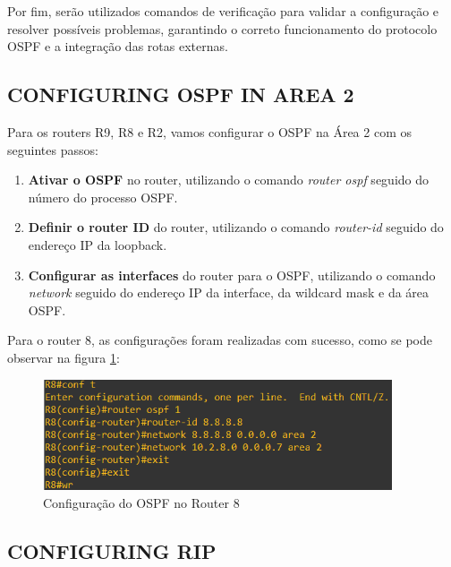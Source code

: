 \documentclass[11pt,english, openright, oneside]{book}
\begin{document}
Por fim, serão utilizados comandos de verificação para validar a configuração e resolver possíveis problemas, garantindo o correto funcionamento do protocolo OSPF e a integração das rotas externas.
\vspace{0.2cm}

\subsection{CONFIGURING OSPF IN AREA 2}
\vspace{0.2cm}

Para os routers R9, R8 e R2, vamos configurar o OSPF na Área 2 com os seguintes passos:
\vspace{0.2cm}

\begin{enumerate}
  \item \textbf{Ativar o OSPF} no router, utilizando o comando \textit{router ospf} seguido do número do processo OSPF.
  \item \textbf{Definir o router ID} do router, utilizando o comando \textit{router-id} seguido do endereço IP da loopback.
  \item \textbf{Configurar as interfaces} do router para o OSPF, utilizando o comando \textit{network} seguido do endereço IP da interface, da wildcard mask e da área OSPF.
\end{enumerate}
\vspace{0.2cm}

Para o router 8, as configurações foram realizadas com sucesso, como se pode observar na figura \ref{fig:config30}:
\vspace{0.2cm}

\begin{figure}[H]
  \centering
  \includegraphics[width=0.92\textwidth]{imagens/Tarefa4/17.config_R8.png}
  \caption{Configuração do OSPF no Router 8}
  \label{fig:config30}
\end{figure}
\vspace{0.2cm}

\subsection{CONFIGURING RIP}
\vspace{0.2cm}
\end{document}
